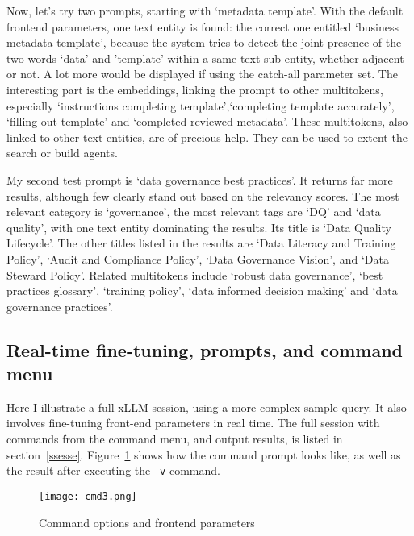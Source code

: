 \documentclass[10pt]{article}
\begin{document}
{%

\noindent Now, let's try two prompts, starting with `metadata template'. With
the default frontend parameters, one text entity is found: the correct one entitled `business metadata template', because the system tries to detect the joint presence of
 the two words `data' and 'template' within a same \textcolor{index}{text sub-entity}, whether adjacent or not. A lot more would be displayed if
 using the catch-all parameter set. The interesting part is the embeddings, linking the prompt to other multitokens, especially
`instructions completing template',`completing template accurately',
 `filling out template' and `completed reviewed metadata'. These multitokens, also linked to other text entities,  are of precious help.
They can be used to extent the search or build \textcolor{index}{agents}. 


My second test prompt is `data governance best practices'. It returns far more results, although few clearly stand out based on the relevancy scores. 
The most relevant category is `governance', the most relevant tags are `DQ' and `data quality', with one text entity 
 dominating the results. Its title is `Data Quality Lifecycle'. The other titles listed in the results
 are `Data Literacy and Training Policy', `Audit and Compliance Policy', `Data Governance Vision', and `Data Steward Policy'.
Related multitokens include `robust data governance', `best practices glossary', `training policy', `data informed decision making' and
 `data governance practices'.  

\subsection{Real-time fine-tuning, prompts, and command menu}%

Here I illustrate a full xLLM session, using a more complex sample query. It also involves fine-tuning front-end parameters in real time. 
The full session with commands from the command menu, and output results, is listed in
 section~\ref{ssesse}. Figure~\ref{gtfjibs3419} shows how the command prompt looks like, as well as the result after executing the 
\texttt{-v} command.


\begin{figure}[H]
\centering
\texttt{[image: cmd3.png]}
\caption{Command options and frontend parameters}
\label{gtfjibs3419}
\end{figure}

}
\end{document}
